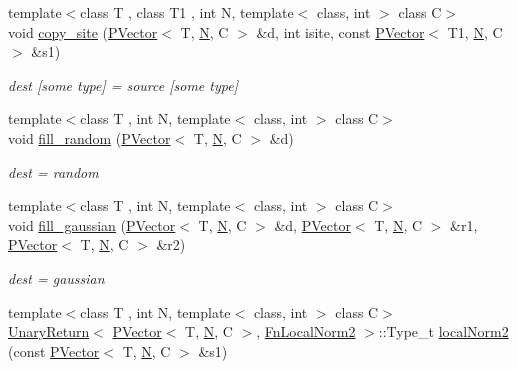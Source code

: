 \begin{DoxyCompactItemize}
{\footnotesize template$<$class T , class T1 , int N, template$<$ class, int $>$ class C$>$ }\\void \mbox{\hyperlink{group__primvector_ga7ec4d85cf781e6147a5e1b9ac46234e4}{copy\+\_\+site}} (\mbox{\hyperlink{classENSEM_1_1PVector}{P\+Vector}}$<$ T, \mbox{\hyperlink{operator__name__util_8cc_a7722c8ecbb62d99aee7ce68b1752f337}{N}}, C $>$ \&d, int isite, const \mbox{\hyperlink{classENSEM_1_1PVector}{P\+Vector}}$<$ T1, \mbox{\hyperlink{operator__name__util_8cc_a7722c8ecbb62d99aee7ce68b1752f337}{N}}, C $>$ \&s1)
\begin{DoxyCompactList}\small\item\em dest \mbox{[}some type\mbox{]} = source \mbox{[}some type\mbox{]} \end{DoxyCompactList}\item 
{\footnotesize template$<$class T , int N, template$<$ class, int $>$ class C$>$ }\\void \mbox{\hyperlink{group__primvector_ga3170048baaf649f10798f2d8e0b41c86}{fill\+\_\+random}} (\mbox{\hyperlink{classENSEM_1_1PVector}{P\+Vector}}$<$ T, \mbox{\hyperlink{operator__name__util_8cc_a7722c8ecbb62d99aee7ce68b1752f337}{N}}, C $>$ \&d)
\begin{DoxyCompactList}\small\item\em dest = random \end{DoxyCompactList}\item 
{\footnotesize template$<$class T , int N, template$<$ class, int $>$ class C$>$ }\\void \mbox{\hyperlink{group__primvector_ga54096af2b60c9427d37bd363286b820f}{fill\+\_\+gaussian}} (\mbox{\hyperlink{classENSEM_1_1PVector}{P\+Vector}}$<$ T, \mbox{\hyperlink{operator__name__util_8cc_a7722c8ecbb62d99aee7ce68b1752f337}{N}}, C $>$ \&d, \mbox{\hyperlink{classENSEM_1_1PVector}{P\+Vector}}$<$ T, \mbox{\hyperlink{operator__name__util_8cc_a7722c8ecbb62d99aee7ce68b1752f337}{N}}, C $>$ \&r1, \mbox{\hyperlink{classENSEM_1_1PVector}{P\+Vector}}$<$ T, \mbox{\hyperlink{operator__name__util_8cc_a7722c8ecbb62d99aee7ce68b1752f337}{N}}, C $>$ \&r2)
\begin{DoxyCompactList}\small\item\em dest = gaussian \end{DoxyCompactList}\item 
{\footnotesize template$<$class T , int N, template$<$ class, int $>$ class C$>$ }\\\mbox{\hyperlink{structENSEM_1_1UnaryReturn}{Unary\+Return}}$<$ \mbox{\hyperlink{classENSEM_1_1PVector}{P\+Vector}}$<$ T, \mbox{\hyperlink{operator__name__util_8cc_a7722c8ecbb62d99aee7ce68b1752f337}{N}}, C $>$, \mbox{\hyperlink{structENSEM_1_1FnLocalNorm2}{Fn\+Local\+Norm2}} $>$\+::Type\+\_\+t \mbox{\hyperlink{group__primvector_ga50edf2bff5393989dac9f89e511257be}{local\+Norm2}} (const \mbox{\hyperlink{classENSEM_1_1PVector}{P\+Vector}}$<$ T, \mbox{\hyperlink{operator__name__util_8cc_a7722c8ecbb62d99aee7ce68b1752f337}{N}}, C $>$ \&s1)

\end{DoxyCompactItemize}
